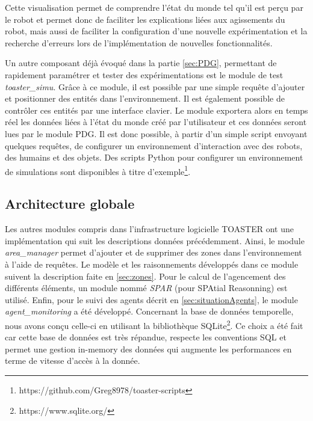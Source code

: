 \documentclass[a4paper,11pt,twoside]{StyleThese}
\begin{document}
Cette visualisation permet de comprendre l'état du monde tel qu'il est perçu par le robot et permet donc de faciliter les explications liées aux agissements du robot, mais aussi de faciliter la configuration d'une nouvelle expérimentation et la recherche d'erreurs lors de l'implémentation de nouvelles fonctionnalités. 


Un autre composant déjà évoqué dans la partie \ref{sec:PDG}, permettant de rapidement paramétrer et tester des expérimentations est le module de test \textit{toaster\_simu}. Grâce à ce module, il est possible par une simple requête d'ajouter et positionner des entités dans l'environnement. Il est également possible de contrôler ces entités par une interface clavier. Le module exportera alors en temps réel les données liées à l'état du monde créé par l'utilisateur et ces données seront lues par le module PDG. Il est donc possible, à partir d'un simple script envoyant quelques requêtes, de configurer un environnement d'interaction avec des robots, des humains et des objets. Des scripts Python pour configurer un environnement de simulations sont disponibles à titre d'exemple\footnote{https://github.com/Greg8978/toaster-scripts}.


\subsection{Architecture globale}
Les autres modules compris dans l'infrastructure logicielle TOASTER ont une implémentation qui suit les descriptions données précédemment.
Ainsi, le module \textit{area\_manager} permet d'ajouter et de supprimer des zones dans l'environnement à l'aide de requêtes. Le modèle et les raisonnements développés dans ce module suivent la description faite en \ref{sec:zones}. Pour le calcul de l'agencement des différents éléments, un module nommé \textit{SPAR} (pour SPAtial Reasonning) est utilisé. Enfin, pour le suivi des agents décrit en \ref{sec:situationAgents}, le module \textit{agent\_monitoring} a été développé.
Concernant la base de données temporelle, nous avons conçu celle-ci en utilisant la bibliothèque SQLite\footnote{https://www.sqlite.org/}. Ce choix a été fait car cette base de données est très répandue, respecte les conventions SQL et permet une gestion in-memory des données qui augmente les performances en terme de vitesse d'accès à la donnée.
\end{document}
